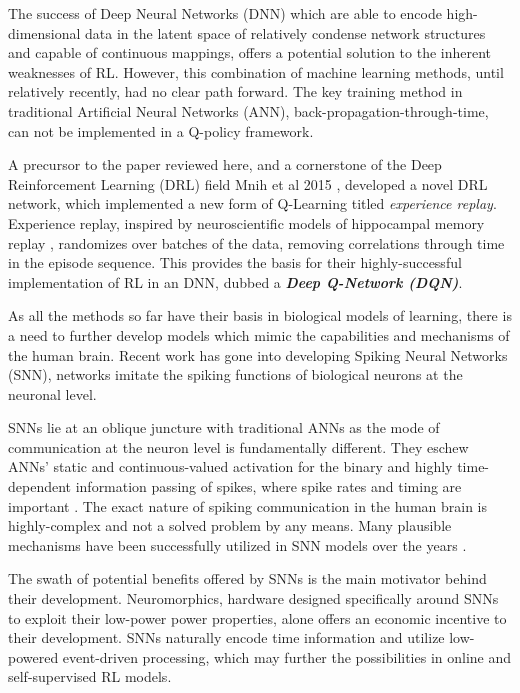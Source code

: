 \documentclass[
]{article}
\begin{document}
The success of Deep Neural Networks (DNN) which are able to encode
high-dimensional data in the latent space of relatively condense network
structures and capable of continuous mappings, offers a potential
solution to the inherent weaknesses of RL. However, this combination of
machine learning methods, until relatively recently, had no clear path
forward. The key training method in traditional Artificial Neural
Networks (ANN), back-propagation-through-time, can not be implemented in
a Q-policy framework.

A precursor to the paper reviewed here, and a cornerstone of the Deep
Reinforcement Learning (DRL) field Mnih et al 2015
\autocite{mnihHumanlevelControlDeep2015}, developed a novel DRL
network, which implemented a new form of Q-Learning titled
\emph{experience replay}. Experience replay, inspired by neuroscientific
models of hippocampal memory replay
\autocite{bendorBiasingContentHippocampal2012}
\autocite{oneillPlayItAgain2010}, randomizes over batches of the data,
removing correlations through time in the episode sequence. This
provides the basis for their highly-successful implementation of RL in
an DNN, dubbed a \textbf{\emph{Deep Q-Network (DQN)}}.

As all the methods so far have their basis in biological models of
learning, there is a need to further develop models which mimic the
capabilities and mechanisms of the human brain. Recent work has gone
into developing Spiking Neural Networks (SNN), networks imitate the
spiking functions of biological neurons at the neuronal level.

SNNs lie at an oblique juncture with traditional ANNs as the mode of
communication at the neuron level is fundamentally different. They
eschew ANNs' static and continuous-valued activation for the binary and
highly time-dependent information passing of spikes, where spike rates
and timing are important
\autocite{tanStrategyBenchmarkConverting2020}. The exact nature
of spiking communication in the human brain is highly-complex and not a
solved problem by any means. Many plausible mechanisms have been
successfully utilized in SNN models over the years
\autocite{vigneronCriticalSurveySTDP2020}.

The swath of potential benefits offered by SNNs is the main motivator
behind their development. Neuromorphics, hardware designed specifically
around SNNs to exploit their low-power power properties, alone offers an
economic incentive to their development. SNNs naturally encode time
information and utilize low-powered event-driven processing, which may
further the possibilities in online and self-supervised RL models.
\end{document}
